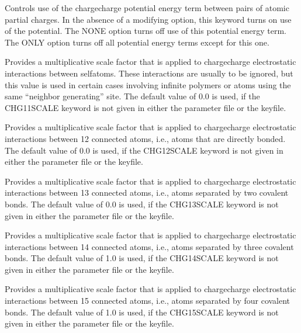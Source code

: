 \documentclass[letterpaper,11pt,english]{sphinxmanual}
\begin{document}
  Controls use of the charge\sphinxhyphen{}charge potential energy term between pairs of atomic partial charges. In the absence of a modifying option, this keyword turns on use of the potential. The NONE option turns off use of this potential energy term. The ONLY option turns off all potential energy terms except for this one.


  Provides a multiplicative scale factor that is applied to charge\sphinxhyphen{}charge electrostatic interactions between self\sphinxhyphen{}atoms. These interactions are usually to be ignored, but this value is used in certain cases involving infinite polymers or atoms using the same “neighbor generating” site. The default value of 0.0 is used, if the CHG\sphinxhyphen{}11\sphinxhyphen{}SCALE keyword is not given in either the parameter file or the keyfile.

  Provides a multiplicative scale factor that is applied to charge\sphinxhyphen{}charge electrostatic interactions between 1\sphinxhyphen{}2 connected atoms, i.e., atoms that are directly bonded. The default value of 0.0 is used, if the CHG\sphinxhyphen{}12\sphinxhyphen{}SCALE keyword is not given in either the parameter file or the keyfile.

  Provides a multiplicative scale factor that is applied to charge\sphinxhyphen{}charge electrostatic interactions between 1\sphinxhyphen{}3 connected atoms, i.e., atoms separated by two covalent bonds. The default value of 0.0 is used, if the CHG\sphinxhyphen{}13\sphinxhyphen{}SCALE keyword is not given in either the parameter file or the keyfile.

  Provides a multiplicative scale factor that is applied to charge\sphinxhyphen{}charge electrostatic interactions between 1\sphinxhyphen{}4 connected atoms, i.e., atoms separated by three covalent bonds. The default value of 1.0 is used, if the CHG\sphinxhyphen{}14\sphinxhyphen{}SCALE keyword is not given in either the parameter file or the keyfile.

  Provides a multiplicative scale factor that is applied to charge\sphinxhyphen{}charge electrostatic interactions between 1\sphinxhyphen{}5 connected atoms, i.e., atoms separated by four covalent bonds. The default value of 1.0 is used, if the CHG\sphinxhyphen{}15\sphinxhyphen{}SCALE keyword is not given in either the parameter file or the keyfile.
\end{document}
